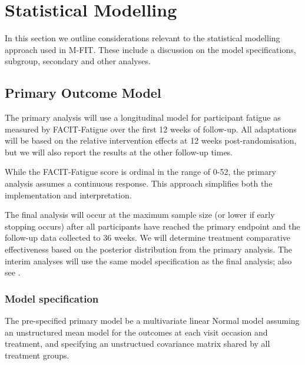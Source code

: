 \documentclass[11pt,parskip=half-]{scrartcl}
\begin{document}
\clearpage

\section{Statistical Modelling}\label{statistical-modelling}

In this section we outline considerations relevant to the statistical modelling approach used in M-FIT. These include a discussion on the model specifications, subgroup, secondary and other analyses.

\subsection{Primary Outcome Model}\label{primary-model}

The primary analysis will use a longitudinal model for participant fatigue as measured by FACIT-Fatigue over the first 12 weeks of follow-up. All adaptations will be based on the relative intervention effects at 12 weeks post-randomisation, but we will also report the results at the other follow-up times.

While the FACIT-Fatigue score is ordinal in the range of 0-52, the primary analysis assumes a continuous response. This approach simplifies both the implementation and interpretation.

The final analysis will occur at the maximum sample size (or lower if early stopping occurs) after all participants have reached the primary endpoint and the follow-up data collected to 36 weeks. We will determine treatment comparative effectiveness based on the posterior distribution from the primary analysis. The interim analyses will use the same model specification as the final analysis; also see .

\subsubsection{Model specification}\label{model-specification}

The pre-specified primary model  be a multivariate linear Normal model assuming an unstructured mean model for the outcomes at each visit occasion and treatment, and specifying an unstructued covariance matrix shared by all treatment groups.
\end{document}
